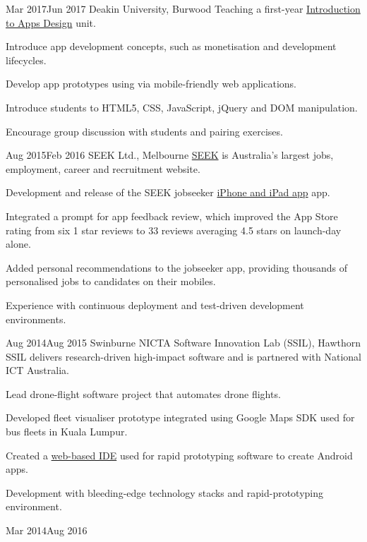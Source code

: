 {    
        {Mar 2017}{Jun 2017}
        {Deakin University, Burwood}
        {Teaching a first-year \href{http://www.deakin.edu.au/current-students-courses/unit.php?unit=SIT120}{Introduction to Apps Design} unit.}
        {
          \item Introduce app development concepts, such as monetisation and development lifecycles.
          \item Develop app prototypes using via mobile-friendly web applications.
          \item Introduce students to HTML5, CSS, JavaScript, jQuery and DOM manipulation.
          \item Encourage group discussion with students and pairing exercises.
        }
    \clearpage
        {Aug 2015}{Feb 2016}
        {SEEK Ltd., Melbourne}
        {\href{http://seek.com.au}{SEEK} is Australia's largest jobs, employment, career and recruitment website.}
        {
          \item Development and release of the SEEK jobseeker \href{https://itunes.apple.com/us/app/seek-jobs/id520400855?mt=8}{iPhone and iPad app} app.
          \item Integrated a prompt for app feedback review, which improved the App Store rating from six 1 star reviews to 33 reviews averaging 4.5 stars on launch-day alone.
          \item Added personal recommendations to the jobseeker app, providing thousands of personalised jobs to candidates on their mobiles.
          \item Experience with continuous deployment and test-driven development environments.
        }
        {Aug 2014}{Aug 2015}
        {Swinburne NICTA Software Innovation Lab (SSIL), Hawthorn}
        {SSIL delivers research-driven high-impact software and is partnered with National ICT Australia.}
        {
          \item Lead drone-flight software project that automates drone flights.
          \item Developed fleet visualiser prototype integrated using Google Maps SDK used for bus fleets in Kuala Lumpur.
          \item Created a \href{http://rappt.io/}{web-based IDE} used for rapid prototyping software to create Android apps.
          \item Development with bleeding-edge technology stacks and rapid-prototyping environment.
        }
        {Mar 2014}{Aug 2016}
}
